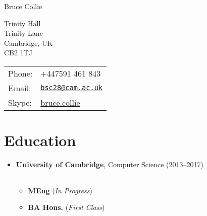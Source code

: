 \documentclass[letterpaper]{article}
\def\name{Bruce Collie}
\begin{document}
{\huge \name}


\vspace{0.25in}

\begin{minipage}{0.45\linewidth}
  Trinity Hall \\
  Trinity Lane \\
  Cambridge, UK \\
  CB2 1TJ
\end{minipage}
\begin{minipage}{0.45\linewidth}
  \begin{tabular}{ll}
    Phone: & +447591 461 843 \\
    Email: & \href{mailto:bsc28@cam.ac.uk}{\tt bsc28@cam.ac.uk} \\
    Skype: & \href{skype:bruce.collie}{bruce.collie}
  \end{tabular}
\end{minipage}

\section*{Education}

\begin{itemize}
  \item \textbf{University of Cambridge}, Computer Science (2013--2017)
        \begin{tabular}{c}
        \end{tabular}
        \begin{itemize}
            \item \textbf{MEng} (\emph{In Progress})
            \item \textbf{BA Hons.} (\emph{First Class})
        \end{itemize}
\end{itemize}
\end{document}
